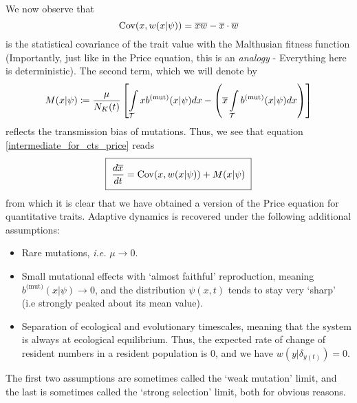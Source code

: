 We now observe that
\begin{equation}
\label{cts_price_cov^{(t)}erm}
\mathrm{Cov}(x,w(x|\psi)) = \overline{xw} - \overline{x}\cdot\overline{w}
\end{equation}
is the statistical covariance of the trait value with the Malthusian fitness function (Importantly, just like in the Price equation, this is an \emph{analogy} - Everything here is deterministic). The second term, which we will denote by
\begin{equation}
\label{cts_price_drift^{(t)}erm}
M(x|\psi) \coloneqq \frac{\mu}{N_K(t)}\left[\int\limits_{\mathcal{T}}xb^{\textrm{(mut)}}(x|\psi)dx - \left(\overline{x}\int\limits_{\mathcal{T}}b^{\textrm{(mut)}}(x|\psi)dx\right)\right] 
\end{equation}
reflects the transmission bias of mutations. Thus, we see that equation \eqref{intermediate_for_cts_price} reads
\begin{equation}
\label{cts_price}
\setlength{\fboxsep}{2\fboxsep}\boxed{\frac{d \overline{x}}{dt} = \mathrm{Cov}(x,w(x|\psi)) + M(x|\psi)}
\end{equation}
from which it is clear that we have obtained a version of the Price equation for quantitative traits.
Adaptive dynamics is recovered under the following additional assumptions:
\begin{itemize}
    \item Rare mutations, \emph{i.e.} $\mu \to 0$.
    \item Small mutational effects with `almost faithful' reproduction, meaning $b^{\textrm{(mut)}}(x|\psi) \to 0$, and the distribution $\psi(x,t)$ tends to stay very `sharp' (i.e strongly peaked about its mean value). 
    \item Separation of ecological and evolutionary timescales, meaning that the system is always at ecological equilibrium. Thus, the expected rate of change of resident numbers in a resident population is $0$, and we have $w(y|\delta_{y(t)}) = 0$.
\end{itemize}
The first two assumptions are sometimes called the `weak mutation' limit, and the last is sometimes called the `strong selection' limit, both for obvious reasons.
